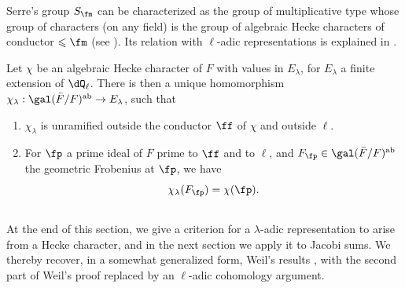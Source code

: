 Serre's group $S_\fm$ can be characterized as the 
group of multiplicative type whose group of characters (on any 
field) is the group of algebraic Hecke characters of conductor 
$\leqslant \fm$ (see \cite[II 2.1 and 2.2]{se68}). Its relation with 
$\ell$-adic representations is explained in \cite[II 2.3]{se68}.





\begin{theorem_}[{\cite{se68}}]\label{VI:5-8}
Let $\chi$ be an algebraic Hecke character of $F$ with values in $E_\lambda$, for 
$E_\lambda$ a finite extension of $\dQ_\ell$. There is then a unique 
  homomorphism $\chi_\lambda:\gal(\bar F/F)^\textnormal{ab} \to E_\lambda$, such 
that 
\begin{enumerate}[\indent (i)]
  \item $\chi_\lambda$ is unramified outside the conductor $\ff$ of 
    $\chi$ and outside $\ell$. 
  \item For $\fp$ a prime ideal of $F$ prime to $\ff$ and to $\ell$, 
    and $F_\fp\in \gal(\bar F/F)^\textnormal{ab}$ the geometric Frobenius 
    at $\fp$, we have 
    \[
      \chi_\lambda(F_\fp) = \chi(\fp) \text{.}
    \] 
\end{enumerate}
\end{theorem_}





\subsection{}\label{VI:5-9}

At the end of this section, we give a criterion for a 
$\lambda$-adic representation to arise from a Hecke character, 
and in the next section we apply it to Jacobi sums. We 
thereby recover, in a somewhat generalized form, Weil's results 
\cite{we52,we74-2}, with the second part of Weil's proof 
replaced by an $\ell$-adic cohomology argument. 





